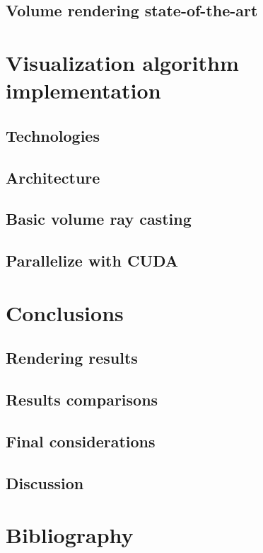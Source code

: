 \documentclass[10pt,a4paper]{article}
\begin{document}
\subsection{Volume rendering state-of-the-art}
\section{Visualization algorithm implementation}
\subsection{Technologies}
\subsection{Architecture}
\subsection{Basic volume ray casting}
\subsection{Parallelize with CUDA}
\section{Conclusions}
\subsection{Rendering results}
\subsection{Results comparisons}
\subsection{Final considerations}
\subsection{Discussion}
\section{Bibliography}
\end{document}
